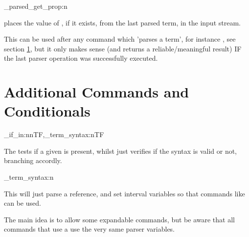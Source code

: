 \documentclass[10pt]{article}
\begin{document}
\begin{codedescribe}[code,EXP,new=2023/05/20]{\starray_parsed_get_prop:n}
\begin{codesyntax}%
\end{codesyntax}
 places the value of , if it exists, from the last parsed term, in the input stream. 
\end{codedescribe}
\begin{tsremark}
This can be used after any command which 'parses a term', for instance , see section \ref{conditionals:terms}, but it only makes sense (and returns a reliable/meaningful result) IF the last parser operation was successfully executed.
\end{tsremark}


\section{Additional Commands and Conditionals}\label{conditionals:terms}

\begin{codedescribe}{\starray_if_in:nnTF,\starray_term_syntax:nTF}
\begin{codesyntax}%
\end{codesyntax}
The  tests if a given  is present, whilst   just verifies if the  syntax is valid or not, branching accordly.
\end{codedescribe}

\begin{codedescribe}[code,new=2023/05/20]{\starray_term_syntax:n}
\begin{codesyntax}%
\end{codesyntax}
This will just parse  a  reference, and set interval variables so that commands like  can be used.
\end{codedescribe}
\begin{tsremark}
The main idea is to allow some expandable commands, but be aware that all \tsobj{\starray_} commands that use a  use the very same parser variables.
\end{tsremark}
\end{document}

